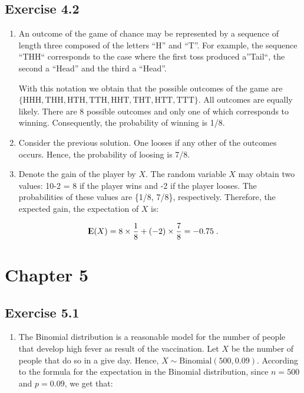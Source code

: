 \documentclass[]{krantz}
\providecommand{\tightlist}{%
  \setlength{\itemsep}{0pt}\setlength{\parskip}{0pt}}
\newcommand{\Expec}{{\rm I\kern-.3em E}}
\theoremstyle{definition}
\theoremstyle{definition}
\theoremstyle{definition}
\theoremstyle{remark}
\begin{document}
\subsection*{Exercise 4.2}\label{exercise-4.2}


\begin{enumerate}
\def\labelenumi{\arabic{enumi}.}
\item
  An outcome of the game of chance may be represented by a sequence of
  length three composed of the letters ``H'' and ``T''. For example, the
  sequence ``THH`` corresponds to the case where the first toss produced
  a''Tail``, the second a ``Head'' and the third a ``Head''.

  With this notation we obtain that the possible outcomes of the game
  are
  \(\{\mbox{HHH}, \mbox{THH},\mbox{HTH}, \mbox{TTH},\mbox{HHT}, \mbox{THT},\mbox{HTT}, \mbox{TTT}\}\).
  All outcomes are equally likely. There are 8 possible outcomes and
  only one of which corresponds to winning. Consequently, the
  probability of winning is 1/8.
\item
  Consider the previous solution. One looses if any other of the
  outcomes occurs. Hence, the probability of loosing is 7/8.
\item
  Denote the gain of the player by \(X\). The random variable \(X\) may
  obtain two values: 10-2 = 8 if the player wins and -2 if the player
  looses. The probabilities of these values are \{1/8, 7/8\},
  respectively. Therefore, the expected gain, the expectation of \(X\)
  is:
\end{enumerate}

\[\Expec(X) = 8 \times \frac{1}{8} + (-2) \times \frac{7}{8} =-0.75\;.\]

\section*{Chapter 5}\label{chapter-5}


\subsection*{Exercise 5.1}\label{exercise-5.1}


\begin{enumerate}
\def\labelenumi{\arabic{enumi}.}
\tightlist
\item
  The Binomial distribution is a reasonable model for the number of
  people that develop high fever as result of the vaccination. Let \(X\)
  be the number of people that do so in a give day. Hence,
  \(X \sim \mbox{Binomial}(500,0.09)\). According to the formula for the
  expectation in the Binomial distribution, since \(n=500\) and
  \(p=0.09\), we get that:
\end{enumerate}
\end{document}
